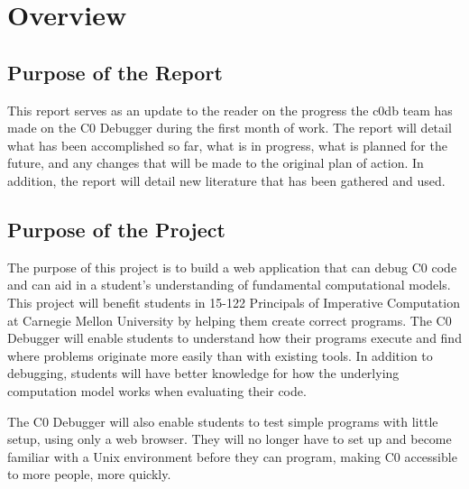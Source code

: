 \section{Overview}
\subsection{Purpose of the Report}
This report serves as an update to the reader on the progress the c0db team has
made on the C0 Debugger during the first month of work. The report will detail
what has been accomplished so far, what is in progress, what is planned for the
future, and any changes that will be made to the original plan of action. In
addition, the report will detail new literature that has been gathered and
used.
\subsection{Purpose of the Project}
The purpose of this project is to build a web application that can debug C0
code and can aid in a student's understanding of fundamental computational
models. This project will benefit students in 15-122 Principals of Imperative
Computation at Carnegie Mellon University by helping them create correct
programs. The C0 Debugger will enable students to understand how their programs
execute and find where problems originate more easily than with existing tools.
In addition to debugging, students will have better knowledge for how the
underlying computation model works when evaluating their code.
\par
The C0 Debugger will also enable students to test simple programs with little
setup, using only a web browser. They will no longer have to set up and become
familiar with a Unix environment before they can program, making C0 accessible
to more people, more quickly.
